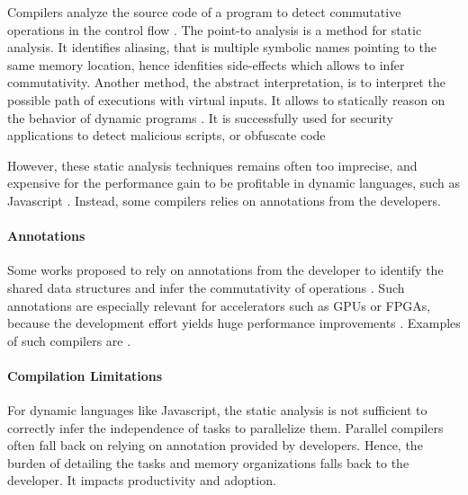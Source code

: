 Compilers analyze the source code of a program to detect commutative operations in the control flow \cite{Allen1970}.
The point-to analysis is a method for static analysis.
It identifies aliasing, that is multiple symbolic names pointing to the same memory location, hence idenfities side-effects \cite{Andersen1994,Jang2009,Sridharan2012,Wei2014} which allows to infer commutativity.
Another method, the abstract interpretation, is to interpret the possible path of executions with virtual inputs.
It allows to statically reason on the behavior of dynamic programs \cite{Maffeis2008,Smith2011,Gardner2012,Hackett2012,Raychev2013,Gardner2013,Bodin2014}.
It is successfully used for security applications to detect malicious scripts, or obfuscate code \cite{Huang2004,Jovanovic2006,Yu2007,Maffeis2009a,Chudnov2015,Dolby2015}

However, these static analysis techniques remains often too imprecise, and expensive for the performance gain to be profitable in dynamic languages, such as Javascript \cite{Shivers1991}.
Instead, some compilers relies on annotations from the developers.

\paragraph{Annotations}

Some works proposed to rely on annotations from the developer to identify the shared data structures and infer the commutativity of operations \cite{Vandierendonck2010a,Fernandez2014a}.
Such annotations are especially relevant for accelerators such as GPUs or FPGAs, because the development effort yields huge performance improvements \cite{Tarditi2006}.
Examples of such compilers are .


\paragraph{Compilation Limitations}

For dynamic languages like Javascript, the static analysis is not sufficient to correctly infer the independence of tasks to parallelize them.
Parallel compilers often fall back on relying on annotation provided by developers.
Hence, the burden of detailing the tasks and memory organizations falls back to the developer.
It impacts productivity and adoption.

